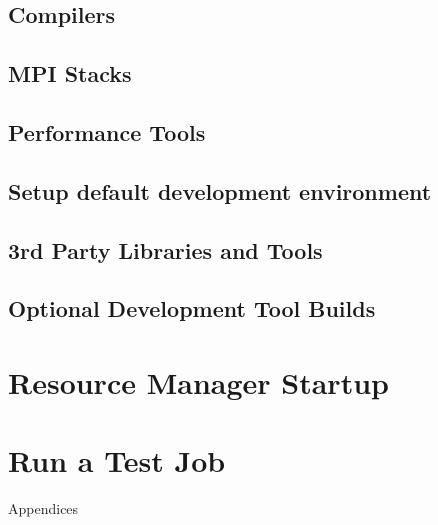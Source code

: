\documentclass[letterpaper]{article}
\begin{document}
\subsection{Compilers} \label{sec:install_compilers}


\vspace*{0.25cm}
\subsection{MPI Stacks} \label{sec:mpi}


\subsection{Performance Tools} \label{sec:install_perf_tools}


\subsection{Setup default development environment}


\subsection{3rd Party Libraries and Tools} \label{sec:3rdparty}





\subsection{Optional Development Tool Builds} \label{sec:3rdparty_arm}


\clearpage
\section{Resource Manager Startup} \label{sec:rms_startup}


\section{Run a Test Job} \label{sec:test_job}


\clearpage
\appendix
{\bf \LARGE \centerline{Appendices}} \vspace*{0.2cm}

\renewcommand{\thesubsection}{\Alph{subsection}}







\end{document}
